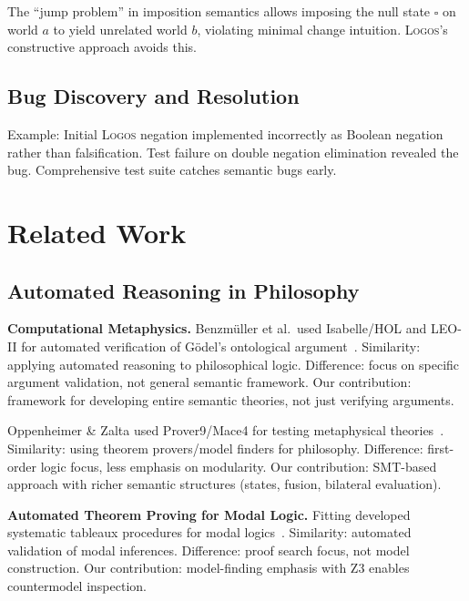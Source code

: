 \documentclass[pdflatex,sn-mathphys-num]{sn-jnl}
\newcommand{\nullstate}{\square}            %
\newcommand{\theorylogos}{\textsc{Logos}}
\theoremstyle{thmstyleone}
\theoremstyle{thmstyletwo}
\theoremstyle{thmstylethree}
\begin{document}
The ``jump problem'' in imposition semantics allows imposing the null state $\nullstate$ on world $a$ to yield unrelated world $b$, violating minimal change intuition.
\theorylogos{}'s constructive approach avoids this.

\subsection{Bug Discovery and Resolution}\label{sec:bug-discovery}

Example: Initial \theorylogos{} negation implemented incorrectly as Boolean negation rather than falsification.
Test failure on double negation elimination revealed the bug.
Comprehensive test suite catches semantic bugs early.


\section{Related Work}\label{sec:related}

\subsection{Automated Reasoning in Philosophy}\label{sec:reasoning-philosophy}

\textbf{Computational Metaphysics.}
Benzmüller et al.\ used Isabelle/HOL and LEO-II for automated verification of Gödel's ontological argument~\cite{benzmuller2014}.
Similarity: applying automated reasoning to philosophical logic.
Difference: focus on specific argument validation, not general semantic framework.
Our contribution: framework for developing entire semantic theories, not just verifying arguments.

Oppenheimer \& Zalta used Prover9/Mace4 for testing metaphysical theories~\cite{oppenheimer2011}.
Similarity: using theorem provers/model finders for philosophy.
Difference: first-order logic focus, less emphasis on modularity.
Our contribution: SMT-based approach with richer semantic structures (states, fusion, bilateral evaluation).

\textbf{Automated Theorem Proving for Modal Logic.}
Fitting developed systematic tableaux procedures for modal logics~\cite{fitting1983}.
Similarity: automated validation of modal inferences.
Difference: proof search focus, not model construction.
Our contribution: model-finding emphasis with Z3 enables countermodel inspection.
\end{document}
